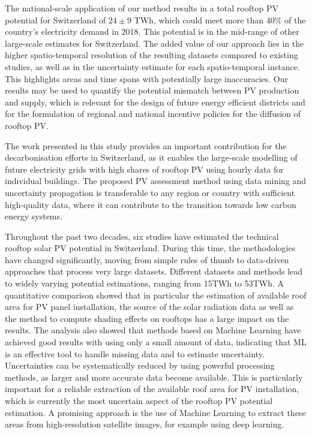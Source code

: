 The national-scale application of our method results in a total rooftop PV potential for Switzerland of $24\pm9$ TWh, which could meet more than 40\% of the country's electricity demand in 2018. 
This potential is in the mid-range of other large-scale estimates for Switzerland.
The added value of our approach lies in the higher spatio-temporal resolution of the resulting datasets compared to existing studies, as well as in the uncertainty estimate for each spatio-temporal instance.
This highlights areas and time spans with potentially large inaccuracies. 
Our results may be used to quantify the potential mismatch between PV production and supply, which is relevant for the design of future energy efficient districts and for the formulation of regional and national incentive policies for the diffusion of rooftop PV.

The work presented in this study provides an important contribution for the decarbonisation efforts in Switzerland, as it enables the large-scale modelling of future electricity grids with high shares of rooftop PV using hourly data for individual buildings. The proposed PV assessment method using data mining and uncertainty propagation is transferable to any region or country with sufficient high-quality data, where it can contribute to the transition towards low carbon energy systems.

Throughout the past two decades, six studies have estimated the technical rooftop solar PV potential in Switzerland. During this time, the methodologies have changed significantly, moving from simple rules of thumb to data-driven approaches that process very large datasets. Different datasets and methods lead to widely varying potential estimations, ranging from 15TWh to 53TWh. A quantitative comparison showed that in particular the estimation of available roof area for PV panel installation, the source of the solar radiation data as well as the method to compute shading effects on rooftops has a large impact on the results. The analysis also showed that methods based on Machine Learning have achieved good results with using only a small amount of data, indicating that ML is an effective tool to handle missing data and to estimate uncertainty. Uncertainties can be systematically reduced by using powerful processing methods, as larger and more accurate data become available. This is particularly important for a reliable extraction of the available roof area for PV installation, which is currently the most uncertain aspect of the rooftop PV potential estimation. A promising approach is the use of Machine Learning to extract these areas from high-resolution satellite images, for example using deep learning. 


